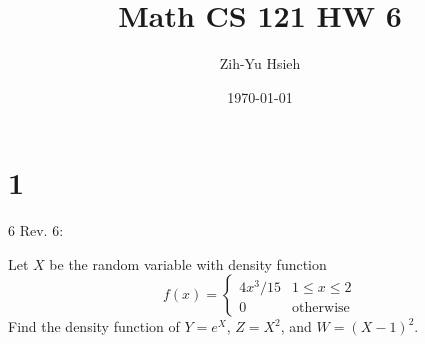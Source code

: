 \documentclass{article}
\title{Math CS 121 HW 6}
\author{Zih-Yu Hsieh}
\date{\today}
\begin{document}
\maketitle

\section*{1}
\begin{ques}\label{q1}
    6 Rev. 6:

    Let $X$ be the random variable with density function
    $$f(x)=\begin{cases}
        4x^3/15 & 1\leq x\leq 2\\
        0 & \text{otherwise}
    \end{cases}$$
    Find the density function of $Y=e^X$, $Z=X^2$, and $W=(X-1)^2$.
\end{ques}
\end{document}
